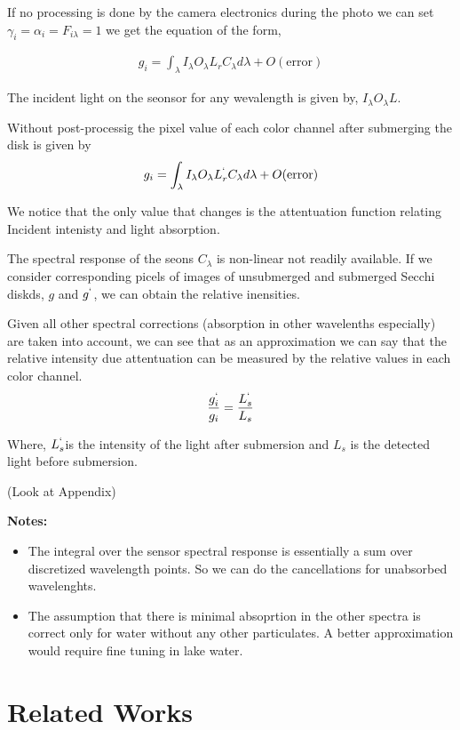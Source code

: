 \documentclass{article}
\begin{document}
If no processing is done by the camera electronics during the photo we can set
$ \gamma_i = \alpha_i = F_{i\lambda} =1$ we get the equation of the form,

\begin{align}
  g_i = \int_{\lambda} I_{\lambda}O_{\lambda} L_{r}C_{\lambda} d\lambda +O(\text{error})
\end{align}

The incident light on the seonsor for any wevalength is given by, $I_{\lambda} O_{\lambda} L$.

Without post-processig the pixel value of each color channel after submerging the disk is given by
\begin{align}
    g_i = \int_{\lambda} I_{\lambda}O_{\lambda} L^{`}_{r}C_{\lambda} d\lambda +O(\text{error})
\end{align}

We notice that the only value that changes is the attentuation function relating Incident intenisty
and light absorption.

The spectral response of the seons $ C_\lambda$ is non-linear not readily available.
If we consider corresponding picels of images of unsubmerged and submerged Secchi
diskds, $ g$ and $g^`$, we can obtain the relative inensities.

Given all other spectral corrections (absorption in other wavelenths especially) are taken into account,
we can see that as an approximation we can say that the relative intensity due attentuation can be
measured by the relative values in each color channel.
\begin{align}
\frac{g_i^`}{g_i} = \frac{L^`_{s}}{L_{s}}
\end{align}

Where, $ L^`_{s}$is the intensity of the light after submersion and $ L_{s}$ is the detected light before submersion.

(Look at Appendix)

\textbf{Notes: }
\begin{itemize}
  \item The integral over the sensor spectral response is essentially a sum over discretized wavelength
  points. So we can do the cancellations for unabsorbed wavelenghts.
  \item The assumption that there is minimal absoprtion in the other spectra is correct only for water without
  any other particulates. A better approximation would require fine tuning in lake water.
\end{itemize}
\section{Related Works}
\end{document}

